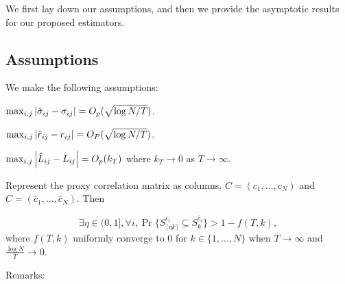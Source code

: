 We first lay down our assumptions, and then we provide the asymptotic results for our proposed estimators.
\subsection{Assumptions}
We make the following assumptions:
\begin{assu}
    \( \max_{i,j} \abs{\hat{\sigma}_{ij} - \sigma_{ij}} = O_{p}(\sqrt{\log N / T}) \). 
    \label{Gaussian asmp}
\end{assu}
\begin{assu}
	$\max_{i,j} \abs{ \hat{r}_{ij} - r_{ij} } = O_P(\sqrt{ \log N / T })$.
    \label{Gaussian asmp cor}
\end{assu}
\begin{assu}
    \( \max_{i,j} \abs{\hat{L}_{ij} - L_{ij}} = O_{p}(k_{T})\) where \(k_{T} \to 0\) as \(T \to \infty\).
    \label{asmp:framework1}
\end{assu}
\begin{assu}
    Represent the proxy correlation matrix as columns. $C=(c_1, \dots , c_N)$ and $\hat C = (\hat{c}_1, \dots, \hat{c}_N)$. Then
    \iffalse
    \begin{equation*}
        \exists \eta \in (0, 1], \forall i, \forall k, \lim_{T\to\infty} \Pr \{  S_{\eta k}^{c_i} \subseteq S_k^{ \hat{c}_i}  \} = 1.
    \end{equation*}
    \fi
    \begin{equation*}
        \exists \eta \in (0, 1], \forall i, \Pr \{ S^{c_i}_{\lceil \eta k \rceil} \subseteq S^{ \hat{c}_i}_k \} > 1 - f(T, k),
    \end{equation*}
    where $f(T, k)$ uniformly converge to $0$ for $k \in \{1, \dots, N\}$ when $T \to \infty$ and $\frac{\log N}{T} \to 0$.
    \label{asmp:framework2}
\end{assu}
\vspace{5mm}
Remarks: 
